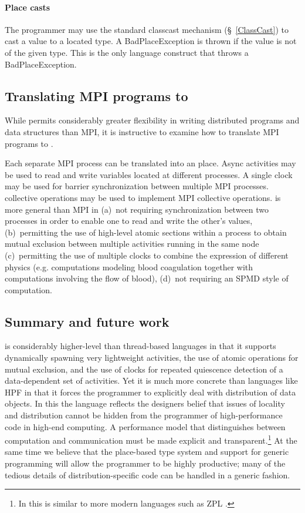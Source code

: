 \paragraph{Place casts}
The programmer may use the standard classcast mechanism
(\S~\ref{ClassCast}) to cast a value to a located type. A {\cf
BadPlaceException} is thrown if the value is not of the given
type. This is the only language construct that throws a {\cf
BadPlaceException}.

\subsection{Translating MPI programs to \Xten{}}

While \Xten{} permits considerably greater flexibility in writing
distributed programs and data structures than MPI, it is instructive
to examine how to translate MPI programs to \Xten.

Each separate MPI process can be translated into an \Xten{}
place. Async activities may be used to read and write variables
located at different processes. A single clock may be used for barrier
synchronization between multiple MPI processes. \Xten{} collective
operations may be used to implement MPI collective operations.
\Xten{} is more general than MPI in (a)~not requiring synchronization
between two processes in order to enable one to read and write the
other's values, (b)~permitting the use of high-level atomic sections
within a process to obtain mutual exclusion between multiple
activities running in the same node (c)~permitting the use of multiple
clocks to combine the expression of different physics (e.g.{}
computations modeling blood coagulation together with computations
involving the flow of blood), (d)~not requiring an SPMD style of
computation.

\subsection{Summary and future work}

{}\Xten{} is considerably higher-level than thread-based languages in
that it supports dynamically spawning very lightweight activities, the
use of atomic operations for mutual exclusion, and the use of clocks
for repeated quiescence detection of a data-dependent set of
activities. Yet it is much more concrete than languages like HPF in
that it forces the programmer to explicitly deal with distribution of
data objects. In this the language reflects the designers belief that
issues of locality and distribution cannot be hidden from the
programmer of high-performance code in high-end computing.  A
performance model that distinguishes between computation and
communication must be made explicit and transparent.\footnote{In this
\Xten{} is similar to more modern languages such as ZPL \cite{zpl}.} At
the same time we believe that the place-based type system and support
for generic programming will allow the \Xten{} programmer to be highly
productive; many of the tedious details of distribution-specific code
can be handled in a generic fashion.

